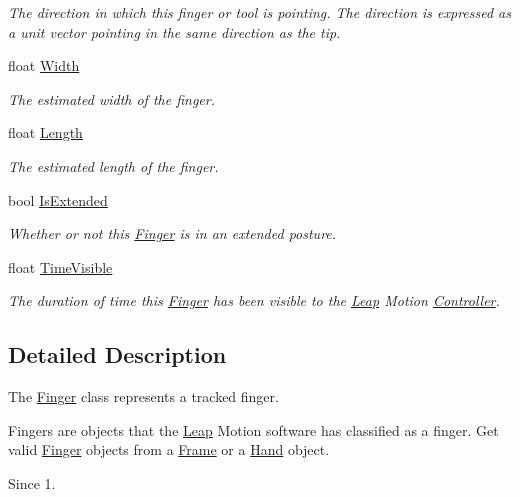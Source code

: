 \begin{DoxyCompactItemize}
\begin{DoxyCompactList}\small\item\em The direction in which this finger or tool is pointing. The direction is expressed as a unit vector pointing in the same direction as the tip. \end{DoxyCompactList}\item 
float \mbox{\hyperlink{class_leap_1_1_finger_a8e432d97bede775d87b8e2585f2b406f}{Width}}
\begin{DoxyCompactList}\small\item\em The estimated width of the finger. \end{DoxyCompactList}\item 
float \mbox{\hyperlink{class_leap_1_1_finger_a063bc32c63fc331e0af54907af53c1b4}{Length}}
\begin{DoxyCompactList}\small\item\em The estimated length of the finger. \end{DoxyCompactList}\item 
bool \mbox{\hyperlink{class_leap_1_1_finger_a31c324f6e2a928fbd516164a6c5bcd7d}{Is\+Extended}}
\begin{DoxyCompactList}\small\item\em Whether or not this \mbox{\hyperlink{class_leap_1_1_finger}{Finger}} is in an extended posture. \end{DoxyCompactList}\item 
float \mbox{\hyperlink{class_leap_1_1_finger_af1bc0f13b6c56b1292e17e4c62b264a9}{Time\+Visible}}
\begin{DoxyCompactList}\small\item\em The duration of time this \mbox{\hyperlink{class_leap_1_1_finger}{Finger}} has been visible to the \mbox{\hyperlink{namespace_leap}{Leap}} Motion \mbox{\hyperlink{class_leap_1_1_controller}{Controller}}. \end{DoxyCompactList}\end{DoxyCompactItemize}


\subsection{Detailed Description}
The \mbox{\hyperlink{class_leap_1_1_finger}{Finger}} class represents a tracked finger. 

Fingers are objects that the \mbox{\hyperlink{namespace_leap}{Leap}} Motion software has classified as a finger. Get valid \mbox{\hyperlink{class_leap_1_1_finger}{Finger}} objects from a \mbox{\hyperlink{class_leap_1_1_frame}{Frame}} or a \mbox{\hyperlink{class_leap_1_1_hand}{Hand}} object. \begin{DoxySince}{Since}
1. 
\end{DoxySince}


